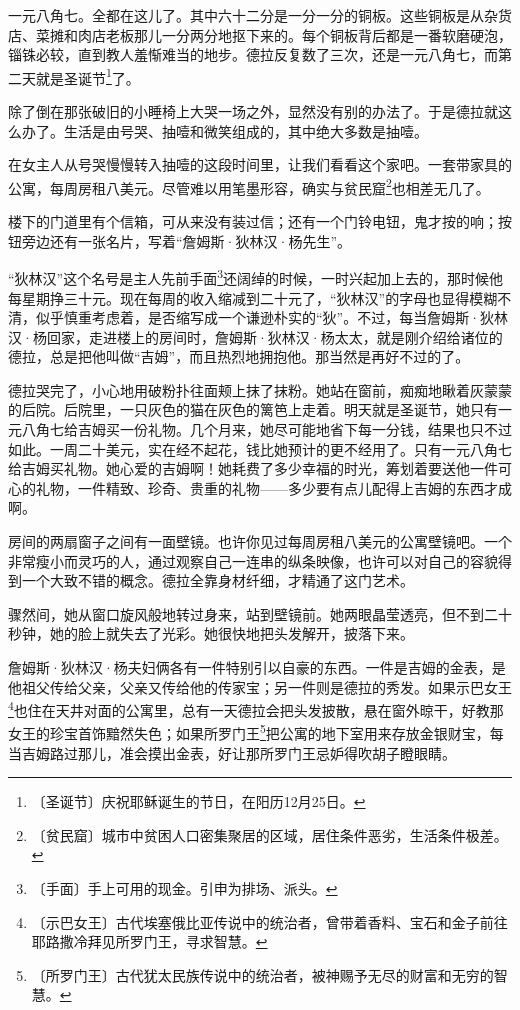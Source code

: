 \documentclass[12pt,UTF-8,openany]{ctexbook}
\begin{document}
\begin{large}
    
    一元八角七。全都在这儿了。其中六十二分是一分一分的铜板。这些铜板是从杂货店、菜摊和肉店老板那儿一分两分地抠下来的。每个铜板背后都是一番软磨硬泡，锱铢必较，直到教人羞惭难当的地步。德拉反复数了三次，还是一元八角七，而第二天就是圣诞节\footnote{〔圣诞节〕庆祝耶稣诞生的节日，在阳历12月25日。}了。
    
    除了倒在那张破旧的小睡椅上大哭一场之外，显然没有别的办法了。于是德拉就这么办了。生活是由号哭、抽噎和微笑组成的，其中绝大多数是抽噎。
    
    在女主人从号哭慢慢转入抽噎的这段时间里，让我们看看这个家吧。一套带家具的公寓，每周房租八美元。尽管难以用笔墨形容，确实与贫民窟\footnote{〔贫民窟〕城市中贫困人口密集聚居的区域，居住条件恶劣，生活条件极差。}也相差无几了。
    
    楼下的门道里有个信箱，可从来没有装过信；还有一个门铃电钮，鬼才按的响；按钮旁边还有一张名片，写着“詹姆斯·狄林汉·杨先生”。
    
    “狄林汉”这个名号是主人先前手面\footnote{〔手面〕手上可用的现金。引申为排场、派头。}还阔绰的时候，一时兴起加上去的，那时候他每星期挣三十元。现在每周的收入缩减到二十元了，“狄林汉”的字母也显得模糊不清，似乎慎重考虑着，是否缩写成一个谦逊朴实的“狄”。不过，每当詹姆斯·狄林汉·杨回家，走进楼上的房间时，詹姆斯·狄林汉·杨太太，就是刚介绍给诸位的德拉，总是把他叫做“吉姆”，而且热烈地拥抱他。那当然是再好不过的了。
    
    德拉哭完了，小心地用破粉扑往面颊上抹了抹粉。她站在窗前，痴痴地瞅着灰蒙蒙的后院。后院里，一只灰色的猫在灰色的篱笆上走着。明天就是圣诞节，她只有一元八角七给吉姆买一份礼物。几个月来，她尽可能地省下每一分钱，结果也只不过如此。一周二十美元，实在经不起花，钱比她预计的更不经用了。只有一元八角七给吉姆买礼物。她心爱的吉姆啊！她耗费了多少幸福的时光，筹划着要送他一件可心的礼物，一件精致、珍奇、贵重的礼物——多少要有点儿配得上吉姆的东西才成啊。
    
    房间的两扇窗子之间有一面壁镜。也许你见过每周房租八美元的公寓壁镜吧。一个非常瘦小而灵巧的人，通过观察自己一连串的纵条映像，也许可以对自己的容貌得到一个大致不错的概念。德拉全靠身材纤细，才精通了这门艺术。
    
    骤然间，她从窗口旋风般地转过身来，站到壁镜前。她两眼晶莹透亮，但不到二十秒钟，她的脸上就失去了光彩。她很快地把头发解开，披落下来。
    
    詹姆斯·狄林汉·杨夫妇俩各有一件特别引以自豪的东西。一件是吉姆的金表，是他祖父传给父亲，父亲又传给他的传家宝；另一件则是德拉的秀发。如果示巴女王\footnote{〔示巴女王〕古代埃塞俄比亚传说中的统治者，曾带着香料、宝石和金子前往耶路撒冷拜见所罗门王，寻求智慧。}也住在天井对面的公寓里，总有一天德拉会把头发披散，悬在窗外晾干，好教那女王的珍宝首饰黯然失色；如果所罗门王\footnote{〔所罗门王〕古代犹太民族传说中的统治者，被神赐予无尽的财富和无穷的智慧。}把公寓的地下室用来存放金银财宝，每当吉姆路过那儿，准会摸出金表，好让那所罗门王忌妒得吹胡子瞪眼睛。
    

\end{large}
\end{document}
